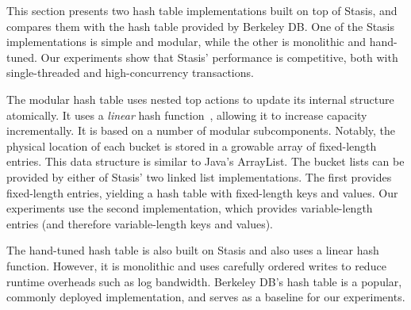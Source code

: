 \documentclass[letterpaper,twocolumn,10pt]{article}
\newcommand{\yad}{Stasis\xspace}
\newcommand{\yads}{Stasis'\xspace}
\begin{document}
This section presents two hash table implementations built on top of
\yad, and compares them with the hash table provided by Berkeley DB.
One of the \yad implementations is simple and modular, while
the other is monolithic and hand-tuned.  Our experiments show that
\yads performance is competitive, both with single-threaded and
high-concurrency transactions.


The modular hash table uses nested top actions to update its internal
structure atomically.  It uses a {\em linear} hash
function~\cite{lht}, allowing it to increase capacity incrementally.
It is based on a number of modular subcomponents.  Notably, the
physical location of each bucket is stored in a growable array of
fixed-length entries.  This data structure is similar to Java's ArrayList.  The bucket lists can be provided by either of
\yads two linked list implementations.  The first provides fixed-length entries,
yielding a hash table with fixed-length keys and values.  
Our experiments use the second implementation, which 
provides variable-length entries (and therefore variable-length
keys and values).



The hand-tuned hash table is also built on \yad and also uses a linear hash
function.  However, it is monolithic and uses carefully ordered writes to
reduce runtime overheads such as log bandwidth.  Berkeley DB's
hash table is a popular, commonly deployed implementation, and serves
as a baseline for our experiments.
\end{document}
